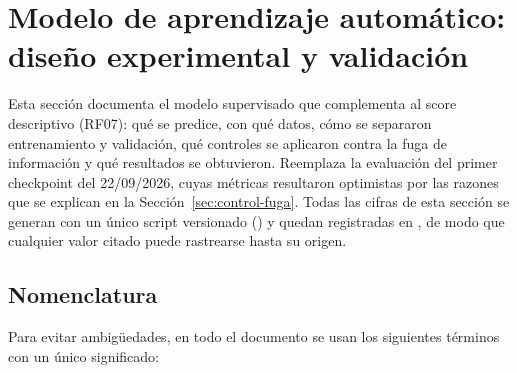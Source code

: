 \chapter{Modelo de aprendizaje automático: diseño experimental y validación}\label{chapter-ml}

Esta sección documenta el modelo supervisado que complementa al score descriptivo (RF07): qué se predice, con qué datos, cómo se separaron entrenamiento y validación, qué controles se aplicaron contra la fuga de información y qué resultados se obtuvieron. Reemplaza la evaluación del primer checkpoint del 22/09/2026, cuyas métricas resultaron optimistas por las razones que se explican en la Sección~\ref{sec:control-fuga}. Todas las cifras de esta sección se generan con un único script versionado () y quedan registradas en , de modo que cualquier valor citado puede rastrearse hasta su origen.

\section{Nomenclatura}\label{sec:nomenclatura}

Para evitar ambigüedades, en todo el documento se usan los siguientes términos con un único significado:

